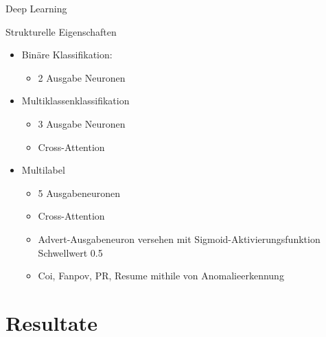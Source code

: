 \documentclass[aspectratio=169]{beamer} %
\begin{document}
\begin{frame}{Deep Learning}
    \begin{block}{Strukturelle Eigenschaften}
        \begin{itemize}
            \item Binäre Klassifikation:
                  \begin{itemize}
                      \item 2 Ausgabe Neuronen
                  \end{itemize}
            \item Multiklassenklassifikation
                  \begin{itemize}
                      \item 3 Ausgabe Neuronen
                      \item Cross-Attention
                  \end{itemize}
            \item Multilabel
                  \begin{itemize}
                      \item 5 Ausgabeneuronen
                      \item Cross-Attention
                      \item Advert-Ausgabeneuron versehen mit Sigmoid-Aktivierungsfunktion Schwellwert 0.5
                      \item Coi, Fanpov, PR, Resume mithile von Anomalieerkennung
                  \end{itemize}
        \end{itemize}

    \end{block}
\end{frame}



\section{Resultate}
\end{document}
